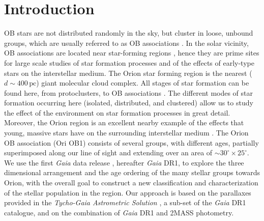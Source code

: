 \documentclass{mem}
\begin{document}
\section{Introduction}
OB stars are not distributed randomly in the sky, but cluster in loose, unbound groups, which are usually referred to as OB associations \citep[]{Blaauw1964}.
In the solar vicinity, OB associations are located near star-forming regions \citep[]{Bally2008}, hence they are prime sites for large scale studies of star formation processes and of the effects of early-type stars on the interstellar medium. 
The Orion star forming region is the nearest ($d \sim 400 \, \mathrm{pc}$) giant molecular cloud complex. All stages of star formation can be found here, from protoclusters, to OB associations \cite[]{Brown1994, Bally2008, Briceno2008, Muench2008, DaRio2014}. The different modes of star formation occurring here (isolated, distributed, and clustered) allow us to study  the effect of the environment on star formation processes in great detail. Moreover, the Orion region is an excellent nearby example of the effects that young, massive stars have on the surrounding interstellar medium \citep[]{Ochsendorf2015, Schlafly2015}. 
The Orion OB association (Ori OB1) consists of several groups, with different ages, partially superimposed along our line of sight \citep[]{Bally2008} and extending over an area of $\sim 30^{\circ} \times 25^{\circ}$.
We use the first \textit{Gaia} data release \citep[]{Brown2016, Prusti2016}, hereafter \textit{Gaia} DR1, to explore the three dimensional arrangement and the age ordering of the many stellar groups towards Orion, with the overall goal to construct a new classification and characterization of the stellar population in the region.  
Our approach is based on the parallaxes provided in the \textit{Tycho-Gaia Astrometric Solution} \citep[TGAS]{Michalik2015, Lindegren2016}, a sub-set of the \textit{Gaia} DR1 catalogue, and on the combination of \textit{Gaia} DR1 and 2MASS photometry.  
\end{document}
